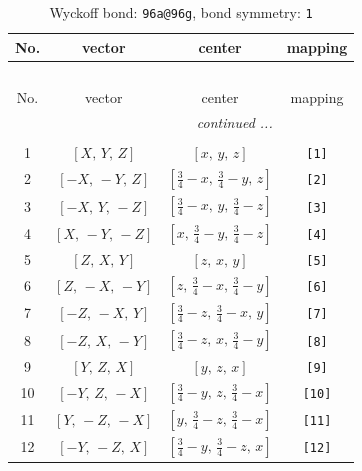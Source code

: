 \documentclass[fleqn,8pt]{jsarticle}
\begin{document}
\begin{longtable}{cccc}
\caption{Wyckoff bond: {\tt 96a@96g}, bond symmetry: {\tt 1}}
 \\
 \hline \hline
No. & vector & center & mapping \\ \hline \endfirsthead

\multicolumn{3}{l}{\tablename\ \thetable{}} \\
 \hline \hline
No. & vector & center & mapping \\ \hline \endhead

 \hline \hline
\multicolumn{3}{r}{\footnotesize\it continued ...} \\ \endfoot

 \hline \hline
\multicolumn{3}{r}{} \\ \endlastfoot

1 & $\left[ X,\, Y,\, Z \right]$ & $\left[ x,\, y,\, z \right]$ & {\tt [1]} \\ \hline
2 & $\left[ - X,\, - Y,\, Z \right]$ & $\left[ \frac{3}{4} - x,\, \frac{3}{4} - y,\, z \right]$ & {\tt [2]} \\ \hline
3 & $\left[ - X,\, Y,\, - Z \right]$ & $\left[ \frac{3}{4} - x,\, y,\, \frac{3}{4} - z \right]$ & {\tt [3]} \\ \hline
4 & $\left[ X,\, - Y,\, - Z \right]$ & $\left[ x,\, \frac{3}{4} - y,\, \frac{3}{4} - z \right]$ & {\tt [4]} \\ \hline
5 & $\left[ Z,\, X,\, Y \right]$ & $\left[ z,\, x,\, y \right]$ & {\tt [5]} \\ \hline
6 & $\left[ Z,\, - X,\, - Y \right]$ & $\left[ z,\, \frac{3}{4} - x,\, \frac{3}{4} - y \right]$ & {\tt [6]} \\ \hline
7 & $\left[ - Z,\, - X,\, Y \right]$ & $\left[ \frac{3}{4} - z,\, \frac{3}{4} - x,\, y \right]$ & {\tt [7]} \\ \hline
8 & $\left[ - Z,\, X,\, - Y \right]$ & $\left[ \frac{3}{4} - z,\, x,\, \frac{3}{4} - y \right]$ & {\tt [8]} \\ \hline
9 & $\left[ Y,\, Z,\, X \right]$ & $\left[ y,\, z,\, x \right]$ & {\tt [9]} \\ \hline
10 & $\left[ - Y,\, Z,\, - X \right]$ & $\left[ \frac{3}{4} - y,\, z,\, \frac{3}{4} - x \right]$ & {\tt [10]} \\ \hline
11 & $\left[ Y,\, - Z,\, - X \right]$ & $\left[ y,\, \frac{3}{4} - z,\, \frac{3}{4} - x \right]$ & {\tt [11]} \\ \hline
12 & $\left[ - Y,\, - Z,\, X \right]$ & $\left[ \frac{3}{4} - y,\, \frac{3}{4} - z,\, x \right]$ & {\tt [12]} \\ \hline

\end{longtable}
\end{document}
